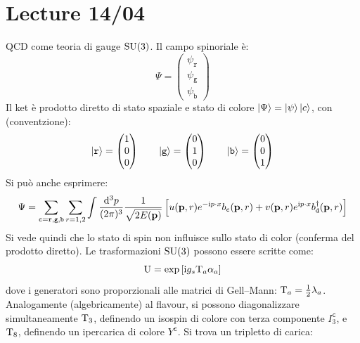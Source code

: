 
\chapter{Lecture 14/04}

QCD come teoria di gauge $ \mathrm{SU}(3) $. Il campo spinoriale è:
\begin{equation*}
  \Psi =
  \begin{pmatrix}
    \psi_\mathtt{r} \\ \psi_\mathtt{g} \\ \psi_\mathtt{b}
  \end{pmatrix}
\end{equation*}
Il ket è prodotto diretto di stato spaziale e stato di colore $ \ket{\Psi} = \ket{\psi} \ket{c} $, con (conventzione):
\begin{equation}
  \ket{\mathtt{r}} =
  \begin{pmatrix}
    1 \\ 0 \\ 0
  \end{pmatrix}
  \qquad
  \ket{\mathtt{g}} =
  \begin{pmatrix}
    0 \\ 1 \\ 0
  \end{pmatrix}
  \qquad
  \ket{\mathtt{b}} =
  \begin{pmatrix}
    0 \\ 0 \\ 1
  \end{pmatrix}
  \label{eq:su3-rappr}
\end{equation}
Si può anche esprimere:
\begin{equation}
  \Psi = \sum_{\mathtt{c} = \mathtt{r},\mathtt{g},\mathtt{b}} \sum_{r = 1,2} \int \frac{\mathrm{d}^3 p}{(2\pi)^3} \frac{1}{\sqrt{2E(\mathbf{p})}} \left[ u(\mathbf{p},r) e^{-\mathrm{i} p \cdot x} b_\mathtt{c}(\mathbf{p},r) + v(\mathbf{p},r) e^{\mathrm{i} p \cdot x} b_\mathtt{d}^\dagger(\mathbf{p},r) \right]
\end{equation}
Si vede quindi che lo stato di spin non influisce sullo stato di color (conferma del prodotto diretto). Le trasformazioni $ \mathrm{SU}(3) $ possono essere scritte come:
\begin{equation}
  \mathrm{U} = \exp \left[ \mathrm{i} g_s \mathrm{T}_a \alpha_a \right]
\end{equation}
dove i generatori sono proporzionali alle matrici di Gell--Mann: $ \mathrm{T}_a = \frac{1}{2} \lambda_a $. Analogamente (algebricamente) al flavour, si possono diagonalizzare simultaneamente $ \mathrm{T}_3 $, definendo un isospin di colore con terza componente $ I_3^\mathtt{c} $, e $ \mathrm{T}_8 $, definendo un ipercarica di colore $ Y^\mathtt{c} $. Si trova un tripletto di carica:
